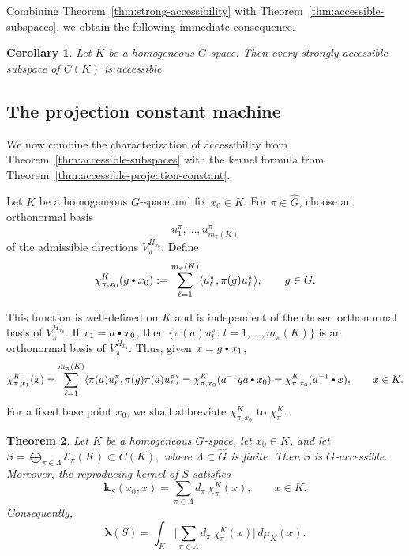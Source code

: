 \documentclass[11pt,showkeys]{amsart}
\newtheorem{theorem}{Theorem}[section]
\newtheorem{corollary}[theorem]{Corollary}
\newcommand{\hbullet}{\mathbin{\vcenter{\hbox{\scalebox{0.7}{$\bullet$}}}}}
\begin{document}
Combining Theorem~\ref{thm:strong-accessibility} with
Theorem~\ref{thm:accessible-subspaces}, we obtain the following
immediate consequence.

\begin{corollary}
Let \(K\) be a homogeneous \(G\)-space. Then every strongly accessible
subspace of \(C(K)\) is accessible.
\end{corollary}

\subsection{The projection constant machine}
\label{sec:The projection constant machine}
We now combine the characterization of accessibility from
Theorem~\ref{thm:accessible-subspaces} with the kernel formula from
Theorem~\ref{thm:accessible-projection-constant}.




Let
\(K\) be a homogeneous \(G\)-space and fix \(x_0\in K\). For
\(\pi\in\widehat G\), choose an orthonormal basis
\[
        u_1^\pi,\ldots,u_{m_\pi(K)}^\pi
\]
of the admissible directions \(V_\pi^{H_{x_0}}\). Define
\[
    \chi_{\pi,x_0}^K(g\hbullet x_0)
    :=
    \sum_{\ell=1}^{m_\pi(K)}
    \langle u_\ell^\pi,\pi(g)u_\ell^\pi\rangle,
    \qquad g\in G.
\]


This function is well-defined on \(K\) and is independent of the
chosen orthonormal basis of \(V_\pi^{H_{x_0}}\). If
\(x_1=a\hbullet x_0\), then \(\{\pi(a)u_l^\pi:\,l=1,\dots,m_\pi(K)\}\) is an orthonormal basis of \(V_\pi^{H_{x_1}}\). Thus, given \(x=g\hbullet x_1\),
\[
    \chi_{\pi,x_1}^K(x)=\sum_{\ell=1}^{m_\pi(K)}
    \langle \pi(a)u_\ell^\pi,\pi(g)\pi(a)u_\ell^\pi\rangle
    =\chi_{\pi,x_0}^K(a^{-1}ga\hbullet x_0)=
    \chi_{\pi,x_0}^K(a^{-1}\hbullet x),
    \qquad x\in K.
\]
For a fixed base point \(x_0\), we shall abbreviate
\(\chi_{\pi,x_0}^K\) to \(\chi_\pi^K\).


\begin{theorem}
\label{thm:homogeneous-machine}
Let \(K\) be a homogeneous \(G\)-space, let \(x_0\in K\), and let
\(
    S
    =
    \bigoplus_{\pi\in\Lambda}
    \mathcal E_\pi(K)
    \subset C(K),
\)
where \(\Lambda\subset\widehat G\) is finite. Then \(S\) is
\(G\)-accessible. Moreover, the reproducing kernel of \(S\) satisfies
\begin{equation*}
    \mathbf k_S(x_0,x)
    =
    \sum_{\pi\in\Lambda}
    d_\pi\,\chi_\pi^K(x),
    \qquad x\in K.
\end{equation*}
Consequently,
\[
    \boldsymbol\lambda(S)
    =
    \int_K
    \Big|
        \sum_{\pi\in\Lambda}
        d_\pi\,\chi_\pi^K(x)
    \Big|
    \,d\mu_K(x).
\]
\end{theorem}
\end{document}
